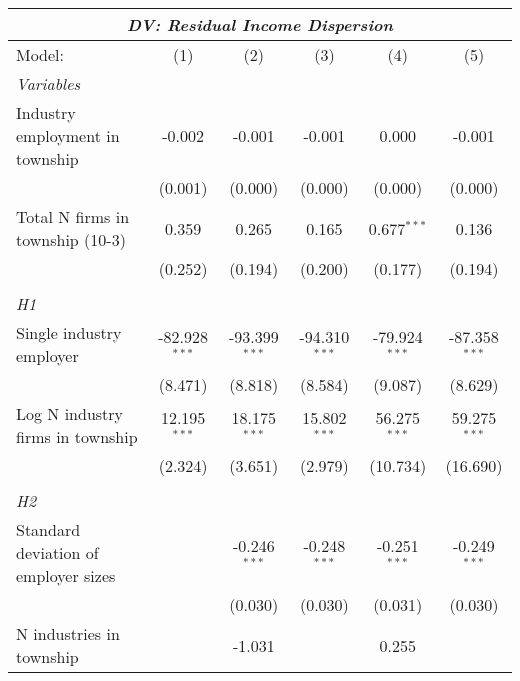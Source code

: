 \begingroup
\centering
\begin{tabular}{lccccc}
   \tabularnewline \multicolumn{6}{c}{\textit{DV: Residual Income Dispersion}} \\ \midrule \midrule
   Model:                               & (1)             & (2)             & (3)             & (4)             & (5)\\  
   \midrule
   \emph{Variables}\\
   Industry employment in township      & -0.002          & -0.001          & -0.001          & 0.000           & -0.001\\   
                                        & (0.001)         & (0.000)         & (0.000)         & (0.000)         & (0.000)\\   
   Total N firms in township (10-3)     & 0.359           & 0.265           & 0.165           & 0.677$^{***}$   & 0.136\\   
                                        & (0.252)         & (0.194)         & (0.200)         & (0.177)         & (0.194)\\   
\hdashline %
\\[0.1ex] %
\emph{H1} \\ 
   Single industry employer             & -82.928$^{***}$ & -93.399$^{***}$ & -94.310$^{***}$ & -79.924$^{***}$ & -87.358$^{***}$\\   
                                        & (8.471)         & (8.818)         & (8.584)         & (9.087)         & (8.629)\\   
   Log N industry firms in township     & 12.195$^{***}$  & 18.175$^{***}$  & 15.802$^{***}$  & 56.275$^{***}$  & 59.275$^{***}$\\   
                                        & (2.324)         & (3.651)         & (2.979)         & (10.734)        & (16.690)\\   
\hdashline %
\\[0.1ex] %
\emph{H2} \\ 
   Standard deviation of employer sizes &                 & -0.246$^{***}$  & -0.248$^{***}$  & -0.251$^{***}$  & -0.249$^{***}$\\   
                                        &                 & (0.030)         & (0.030)         & (0.031)         & (0.030)\\   
   N industries in township             &                 & -1.031          &                 & 0.255           &   \\   

\end{tabular}
